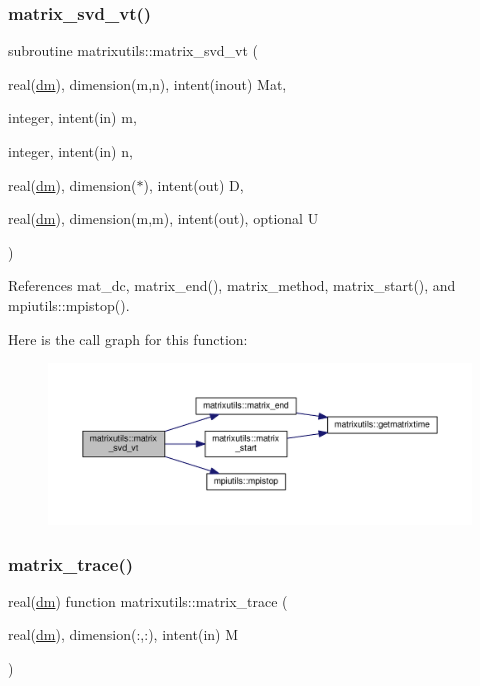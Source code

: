 \subsubsection{\texorpdfstring{matrix\+\_\+svd\+\_\+vt()}{matrix\_svd\_vt()}}
{\footnotesize\ttfamily subroutine matrixutils\+::matrix\+\_\+svd\+\_\+vt (\begin{DoxyParamCaption}\item[{real(\mbox{\hyperlink{namespacematrixutils_a7bdc564986ea4d90f51201c75606ef3d}{dm}}), dimension(m,n), intent(inout)}]{Mat,  }\item[{integer, intent(in)}]{m,  }\item[{integer, intent(in)}]{n,  }\item[{real(\mbox{\hyperlink{namespacematrixutils_a7bdc564986ea4d90f51201c75606ef3d}{dm}}), dimension($\ast$), intent(out)}]{D,  }\item[{real(\mbox{\hyperlink{namespacematrixutils_a7bdc564986ea4d90f51201c75606ef3d}{dm}}), dimension(m,m), intent(out), optional}]{U }\end{DoxyParamCaption})}



References mat\+\_\+dc, matrix\+\_\+end(), matrix\+\_\+method, matrix\+\_\+start(), and mpiutils\+::mpistop().

Here is the call graph for this function\+:
\nopagebreak
\begin{figure}[H]
\begin{center}
\leavevmode
\includegraphics[width=350pt]{namespacematrixutils_a295b572473f10f878fb8d3fc7b8d06f1_cgraph}
\end{center}
\end{figure}
\mbox{\label{namespacematrixutils_aba34e30d438cd387bb0f57e16d60b364}} 
\subsubsection{\texorpdfstring{matrix\+\_\+trace()}{matrix\_trace()}}
{\footnotesize\ttfamily real(\mbox{\hyperlink{namespacematrixutils_a7bdc564986ea4d90f51201c75606ef3d}{dm}}) function matrixutils\+::matrix\+\_\+trace (\begin{DoxyParamCaption}\item[{real(\mbox{\hyperlink{namespacematrixutils_a7bdc564986ea4d90f51201c75606ef3d}{dm}}), dimension(\+:,\+:), intent(in)}]{M }\end{DoxyParamCaption})}



